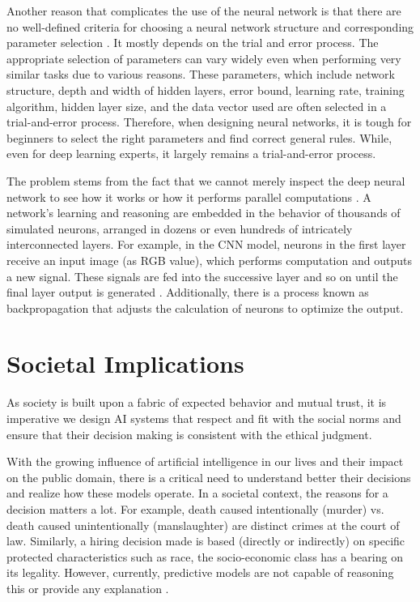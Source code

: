 Another reason that complicates the use of the neural network is that there are no well-defined criteria for choosing a neural network structure and corresponding parameter selection \cite{dlvwz}. It mostly depends on the trial and error process. The appropriate selection of parameters can vary widely even when performing very similar tasks due to various reasons. These parameters, which include network structure, depth and width of hidden layers, error bound, learning rate, training algorithm, hidden layer size, and the data vector used are often selected in a trial-and-error process. Therefore, when designing neural networks, it is tough for beginners to select the right parameters and find correct general rules. While, even for deep learning experts, it largely remains a trial-and-error process. 

The problem stems from the fact that we cannot merely inspect the deep neural network to see how it works or how it performs parallel computations \cite{darksecretaimittr}. A network’s learning and reasoning are embedded in the behavior of thousands of simulated neurons, arranged in dozens or even hundreds of intricately interconnected layers. For example, in the CNN model, neurons in the first layer receive an input image (as RGB value), which performs computation and outputs a new signal. These signals are fed into the successive layer and so on until the final layer output is generated \cite{darksecretaimittr}. Additionally, there is a process known as backpropagation that adjusts the calculation of neurons to optimize the output.

\section{Societal Implications}

As society is built upon a fabric of expected behavior and mutual trust, it is imperative we design AI systems that respect and fit with the social norms and ensure that their decision making is consistent with the ethical judgment. 

With the growing influence of artificial intelligence in our lives and their impact on the public domain, there is a critical need to understand better their decisions and realize how these models operate.  In a societal context, the reasons for a decision matters a lot. For example, death caused intentionally (murder) vs. death caused unintentionally (manslaughter) are distinct crimes at the court of law. Similarly, a hiring decision made is based (directly or indirectly) on specific protected characteristics such as race, the socio-economic class has a bearing on its legality. However, currently, predictive models are not capable of reasoning this or provide any explanation \cite{molnar}.

